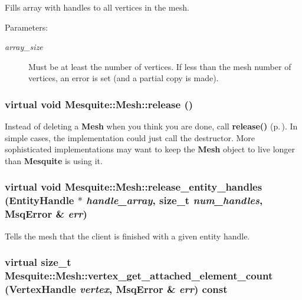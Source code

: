 \documentclass[letter]{report}
\begin{document}
Fills array with handles to all vertices in the mesh.

\begin{Desc}
\item[Parameters: ]\par
\begin{description}
\item[{\em 
array\_\-size}]Must be at least the number of vertices. If less than the mesh number of vertices, an error is set (and a partial copy is made). \end{description}
\end{Desc}


\subsubsection{\setlength{\rightskip}{0pt plus 5cm}virtual void Mesquite::Mesh::release ()\hspace{0.3cm}{\tt  [pure virtual]}}\label{classMesquite_1_1Mesh_a23}


Instead of deleting a {\bf Mesh} when you think you are done, call {\bf release()} {\rm (p.\,\pageref{classMesquite_1_1Mesh_a23})}. In simple cases, the implementation could just call the destructor. More sophisticated implementations may want to keep the {\bf Mesh} object to live longer than {\bf Mesquite} is using it. 

\subsubsection{\setlength{\rightskip}{0pt plus 5cm}virtual void Mesquite::Mesh::release\_\-entity\_\-handles ({\bf Entity\-Handle} $\ast$ {\em handle\_\-array}, size\_\-t {\em num\_\-handles}, {\bf Msq\-Error} \& {\em err})\hspace{0.3cm}{\tt  [pure virtual]}}\label{classMesquite_1_1Mesh_a22}


Tells the mesh that the client is finished with a given entity handle. 

\subsubsection{\setlength{\rightskip}{0pt plus 5cm}virtual size\_\-t Mesquite::Mesh::vertex\_\-get\_\-attached\_\-element\_\-count (Vertex\-Handle {\em vertex}, {\bf Msq\-Error} \& {\em err}) const\hspace{0.3cm}{\tt  [pure virtual]}}\label{classMesquite_1_1Mesh_a15}
\end{document}
